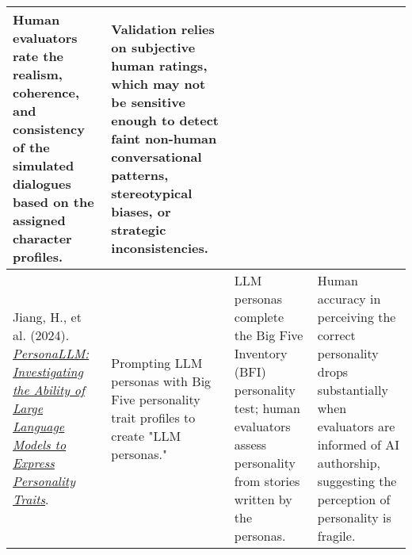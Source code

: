 {\begin{longtable}{| L{4.5cm} | L{3.5cm} | L{3.5cm} | L{3.5cm} |}
\\\hline
Human evaluators rate the realism, coherence, and consistency of the simulated dialogues based on the assigned character profiles. & Validation relies on subjective human ratings, which may not be sensitive enough to detect faint non-human conversational patterns, stereotypical biases, or strategic inconsistencies.
\\\hline
Jiang, H., et al. (2024). \href{https://aclanthology.org/2024.findings-naacl.229/}{\textit{PersonaLLM: Investigating the Ability of Large Language Models to Express Personality Traits}}. & Prompting LLM personas with Big Five personality trait profiles to create "LLM personas." & LLM personas complete the Big Five Inventory (BFI) personality test; human evaluators assess personality from stories written by the personas. & Human accuracy in perceiving the correct personality drops substantially when evaluators are informed of AI authorship, suggesting the perception of personality is fragile.
\\\hline

\end{longtable}
} %